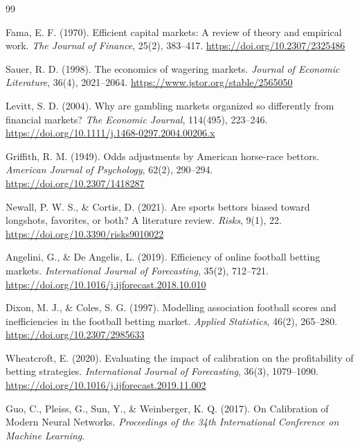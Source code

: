 \documentclass[pdflatex,sn-basic]{sn-jnl}
\begin{document}
\begin{thebibliography}{99}

Fama, E. F. (1970).
\newblock Efficient capital markets: A review of theory and empirical work.
\newblock \emph{The Journal of Finance}, 25(2), 383--417. \url{https://doi.org/10.2307/2325486}

Sauer, R. D. (1998).
\newblock The economics of wagering markets.
\newblock \emph{Journal of Economic Literature}, 36(4), 2021--2064. \url{https://www.jstor.org/stable/2565050}

Levitt, S. D. (2004).
\newblock Why are gambling markets organized so differently from financial markets?
\newblock \emph{The Economic Journal}, 114(495), 223--246. \url{https://doi.org/10.1111/j.1468-0297.2004.00206.x}

Griffith, R. M. (1949).
\newblock Odds adjustments by American horse-race bettors.
\newblock \emph{American Journal of Psychology}, 62(2), 290--294. \url{https://doi.org/10.2307/1418287}

Newall, P. W. S., \& Cortis, D. (2021).
\newblock Are sports bettors biased toward longshots, favorites, or both? A literature review.
\newblock \emph{Risks}, 9(1), 22. \url{https://doi.org/10.3390/risks9010022}

Angelini, G., \& De Angelis, L. (2019).
\newblock Efficiency of online football betting markets.
\newblock \emph{International Journal of Forecasting}, 35(2), 712--721. \url{https://doi.org/10.1016/j.ijforecast.2018.10.010}

Dixon, M. J., \& Coles, S. G. (1997).
\newblock Modelling association football scores and inefficiencies in the football betting market.
\newblock \emph{Applied Statistics}, 46(2), 265--280. \url{https://doi.org/10.2307/2985633}

Wheatcroft, E. (2020).
\newblock Evaluating the impact of calibration on the profitability of betting strategies.
\newblock \emph{International Journal of Forecasting}, 36(3), 1079--1090. \url{https://doi.org/10.1016/j.ijforecast.2019.11.002}

Guo, C., Pleiss, G., Sun, Y., \& Weinberger, K. Q. (2017).
\newblock On Calibration of Modern Neural Networks.
\newblock \emph{Proceedings of the 34th International Conference on Machine Learning}.


\end{thebibliography}
\end{document}
